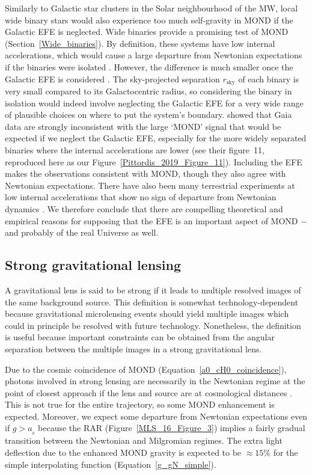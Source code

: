\documentclass[fleqn,usenatbib,useAMS]{mnras} %
\begin{document}
Similarly to Galactic star clusters in the Solar neighbourhood of the MW, local wide binary stars would also experience too much self-gravity in MOND if the Galactic EFE is neglected. Wide binaries provide a promising test of MOND (Section~\ref{Wide_binaries}). By definition, these systems have low internal accelerations, which would cause a large departure from Newtonian expectations if the binaries were isolated \citep{Hernandez_2012}. However, the difference is much smaller once the Galactic EFE is considered \citep{Banik_2018_Centauri}. The sky-projected separation $r_{\text{sky}}$ of each binary is very small compared to its Galactocentric radius, so considering the binary in isolation would indeed involve neglecting the Galactic EFE for a very wide range of plausible choices on where to put the system's boundary. \citet{Pittordis_2019} showed that Gaia data are strongly inconsistent with the large `MOND' signal that would be expected if we neglect the Galactic EFE, especially for the more widely separated binaries where the internal accelerations are lower (see their figure~11, reproduced here as our Figure~\ref{Pittordis_2019_Figure_11}). Including the EFE makes the observations consistent with MOND, though they also agree with Newtonian expectations. There have also been many terrestrial experiments at low internal accelerations that show no sign of departure from Newtonian dynamics \citep{Gundlach_2007}. We therefore conclude that there are compelling theoretical and empirical reasons for supposing that the EFE is an important aspect of MOND $-$ and probably of the real Universe as well.



\subsection{Strong gravitational lensing}
\label{Strong_lensing}

A gravitational lens is said to be strong if it leads to multiple resolved images of the same background source. This definition is somewhat technology-dependent because gravitational microlensing events \citep{Refsdal_1966} should yield multiple images which could in principle be resolved with future technology. Nonetheless, the definition is useful because important constraints can be obtained from the angular separation between the multiple images in a strong gravitational lens.

Due to the cosmic coincidence of MOND (Equation~\ref{a0_cH0_coincidence}), photons involved in strong lensing are necessarily in the Newtonian regime at the point of closest approach if the lens and source are at cosmological distances \citep{Sanders_2014}. This is not true for the entire trajectory, so some MOND enhancement is expected. Moreover, we expect some departure from Newtonian expectations even if $g > a_{_0}$ because the RAR (Figure~\ref{MLS_16_Figure_3}) implies a fairly gradual transition between the Newtonian and Milgromian regimes. The extra light deflection due to the enhanced MOND gravity is expected to be $\approx 15\%$ for the simple interpolating function (Equation~\ref{g_gN_simple}).
\end{document}
